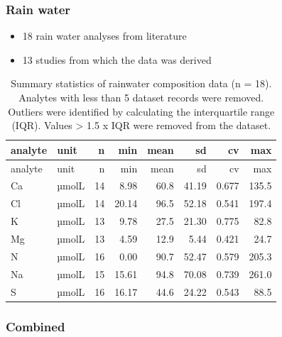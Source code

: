 \documentclass[
]{article}
\providecommand{\tightlist}{%
  \setlength{\itemsep}{0pt}\setlength{\parskip}{0pt}}
\begin{document}
\hypertarget{rain-water}{%
\subsubsection{Rain water}\label{rain-water}}

\begin{itemize}
\tightlist
\item
  18 rain water analyses from literature
\item
  13 studies from which the data was derived
\end{itemize}

\begin{longtable}[]{@{}llrrrrrr@{}}
\caption{Summary statistics of rainwater composition data (n = 18).
Analytes with less than 5 dataset records were removed. Outliers were
identified by calculating the interquartile range (IQR). Values
\textgreater{} 1.5 x IQR were removed from the dataset.}\tabularnewline
\toprule\noalign{}
analyte & unit & n & min & mean & sd & cv & max \\
\midrule\noalign{}
\endfirsthead
\toprule\noalign{}
analyte & unit & n & min & mean & sd & cv & max \\
\midrule\noalign{}
\endhead
\bottomrule\noalign{}
\endlastfoot
Ca & µmolL & 14 & 8.98 & 60.8 & 41.19 & 0.677 & 135.5 \\
Cl & µmolL & 14 & 20.14 & 96.5 & 52.18 & 0.541 & 197.4 \\
K & µmolL & 13 & 9.78 & 27.5 & 21.30 & 0.775 & 82.8 \\
Mg & µmolL & 13 & 4.59 & 12.9 & 5.44 & 0.421 & 24.7 \\
N & µmolL & 16 & 0.00 & 90.7 & 52.47 & 0.579 & 205.3 \\
Na & µmolL & 15 & 15.61 & 94.8 & 70.08 & 0.739 & 261.0 \\
S & µmolL & 16 & 16.17 & 44.6 & 24.22 & 0.543 & 88.5 \\
\end{longtable}

\hypertarget{combined}{%
\subsubsection{Combined}\label{combined}}
\end{document}
